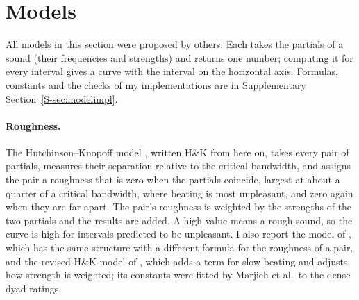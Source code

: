 \documentclass[11pt,a4paper]{article}
\newcommand{\HK}{H\&K}
\begin{document}
\section{Models}
\label{sec:models}

All models in this section were proposed by others. Each takes the partials of a sound
(their frequencies and strengths) and returns one number; computing it for every interval
gives a curve with the interval on the horizontal axis. Formulas, constants and the checks of
my implementations are in Supplementary Section~\ref{S-sec:modelimpl}.

\paragraph{Roughness.}
The Hutchinson--Knopoff model \citep{hutchinson1978}, written \HK{} from here on, takes every
pair of partials, measures their separation relative to the critical bandwidth, and assigns
the pair a roughness that is zero when the partials coincide, largest at about a quarter of a
critical bandwidth, where beating is most unpleasant, and zero again when they are far apart.
The pair's roughness is weighted by the strengths of the two partials and the results are
added. A high value means a rough sound, so the curve is high for intervals predicted to be
unpleasant. I also report the model of \citet{sethares1993}, which has the same structure
with a different formula for the roughness of a pair, and the revised \HK{} model of \citet{marjieh2024},
which adds a term for slow beating and adjusts how strength is weighted; its constants were
fitted by Marjieh et al.\ to the dense dyad ratings.
\end{document}
